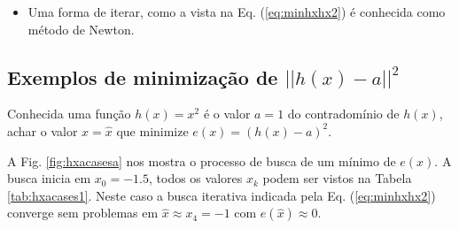 \begin{tcbattention}
\begin{itemize}
\item Uma forma de iterar, como a vista na Eq. (\ref{eq:minhxhx2}) é conhecida como método de Newton.
\end{itemize}
\end{tcbattention}


\subsection{Exemplos de minimização de $||h(x)-a||^2$}


\begin{example}\label{ex:minhxhx1}
Conhecida uma função $h(x)=x^2$ é o valor $a=1$ do contradomínio de $h(x)$,
achar o valor $x=\hat{x}$ que minimize $e(x)=(h(x)-a)^2$.
\end{example}
\begin{SolutionT}\label{sol:minhxhx1}
 A Fig. \ref{fig:hxacasesa} nos mostra o processo de busca de um mínimo de $e(x)$. 
A busca inicia em $x_0=-1.5$, 
todos os valores $x_{k}$ podem ser vistos na
Tabela \ref{tab:hxacases1}. 
Neste caso a busca iterativa indicada pela Eq. (\ref{eq:minhxhx2}) converge sem problemas em $\hat{x}\approx x_4=-1$ com $e(\hat{x})\approx 0$.
\end{SolutionT}

